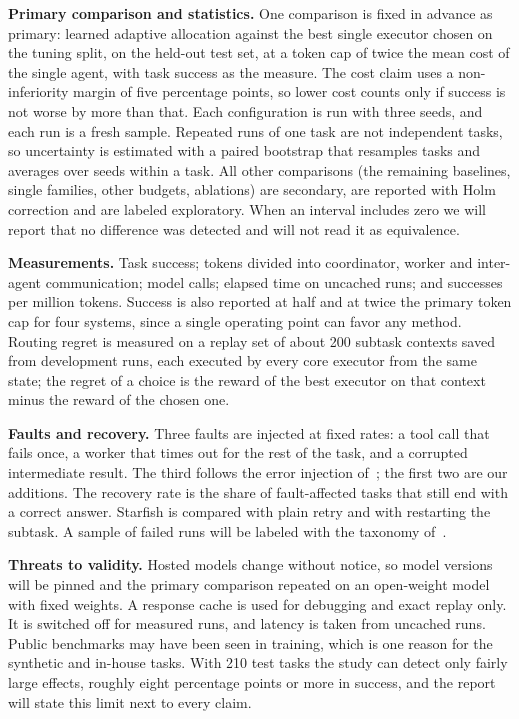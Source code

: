 \documentclass[11pt,a4paper]{article}
\newcommand{\runin}[1]{\textbf{#1}\quad}
\begin{document}
\runin{Primary comparison and statistics.}
One comparison is fixed in advance as primary: learned adaptive allocation against the best single executor
chosen on the tuning split, on the held-out test set, at a token cap of twice the mean cost of the single
agent, with task success as the measure. The cost claim uses a non-inferiority margin of five percentage
points, so lower cost counts only if success is not worse by more than that. Each configuration is run
with three seeds, and each run is a fresh sample. Repeated runs of one task are not independent tasks, so
uncertainty is estimated with a paired bootstrap that resamples tasks and averages over seeds within a
task. All other comparisons (the remaining baselines, single families, other budgets, ablations) are
secondary, are reported with Holm correction and are labeled exploratory. When an interval includes zero we
will report that no difference was detected and will not read it as equivalence.

\runin{Measurements.}
Task success; tokens divided into coordinator, worker and inter-agent communication; model calls; elapsed
time on uncached runs; and successes per million tokens. Success is also reported at half and at twice the
primary token cap for four systems, since a single operating point can favor any method. Routing regret is
measured on a replay set of about 200 subtask contexts saved from development runs, each executed by every
core executor from the same state; the regret of a choice is the reward of the best executor on that
context minus the reward of the chosen one.

\runin{Faults and recovery.}
Three faults are injected at fixed rates: a tool call that fails once, a worker that times out for the rest
of the task, and a corrupted intermediate result. The third follows the error injection
of~\cite{huang2025resilience}; the first two are our additions. The recovery rate is the share of
fault-affected tasks that still end with a correct answer. Starfish is compared with plain retry and with
restarting the subtask. A sample of failed runs will be labeled with the taxonomy of~\cite{cemri2025mast}.

\runin{Threats to validity.}
Hosted models change without notice, so model versions will be pinned and the primary comparison repeated
on an open-weight model with fixed weights. A response cache is used for debugging and exact replay only.
It is switched off for measured runs, and latency is taken from uncached runs. Public benchmarks may have
been seen in training, which is one reason for the synthetic and in-house tasks. With 210 test tasks the
study can detect only fairly large effects, roughly eight percentage points or more in success, and the
report will state this limit next to every claim.
\end{document}
